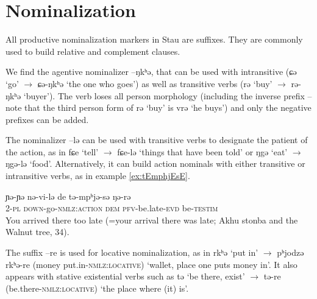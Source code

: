 \documentclass[oneside,a4paper,11pt]{article}
\newcommand{\ipa}[1]{{\phon #1}} %
\begin{document}
 


%
%
%
%
%
%

%


\section{Nominalization} \label{sec:nmlz}
All productive nominalization markers in Stau are suffixes. They are commonly used to build relative and complement clauses.

We find the agentive nominalizer \ipa{--ŋkʰə}, that can be used with intransitive (\ipa{ɕə}  `go' $\rightarrow$ \ipa{ɕə-ŋkʰə} `the one who goes') as well as transitive verbs (\ipa{rə} `buy' $\rightarrow$ \ipa{rə-ŋkʰə} `buyer'). The verb loses all person morphology (including the inverse prefix -- note that the third person form of \ipa{rə} `buy' is \ipa{vrə} `he buys') and only the negative prefixes can be added.
 
The nominalizer \ipa{--lə} can be used with transitive verbs to designate the patient of the action, as in \ipa{fɕe} `tell' $\rightarrow$ \ipa{fɕe-lə} `things that have been told' or \ipa{ŋgə} `eat' $\rightarrow$ \ipa{ŋgə-lə} `food'. Alternatively, it can build action nominals with either transitive or intransitive verbs, as  in example \ref{ex:tEmphjEsE}.

\begin{exe}
\ex \label{ex:tEmphjEsE} 
\gll
\ipa{ɲə-ɲə} 	\ipa{nə-vi-lə} 	\ipa{de} 	\ipa{tə-mpʰjə-sə} 	\ipa{ŋə-rə} \\
2-\textsc{pl} \textsc{down}-go-\textsc{nmlz:action} \textsc{dem} \textsc{pfv}-be.late-\textsc{evd} be-\textsc{testim}\\
\glt You arrived there too late (=your arrival there was late; Akhu stonba and the Walnut tree, 34).
\end{exe}

The suffix \ipa{--re} is used for locative nominalization, as in \ipa{rkʰə} `put in' $\rightarrow$ \ipa{pʰjodzə} \ipa{rkʰə-re} (money put.in-\textsc{nmlz:locative}) `wallet, place one puts money in'. It also appears with stative existential verbs such as \ipa{tə} `be there, exist' $\rightarrow$ \ipa{tə-re} (be.there-\textsc{nmlz:locative}) `the place where (it) is'. 
\end{document}
